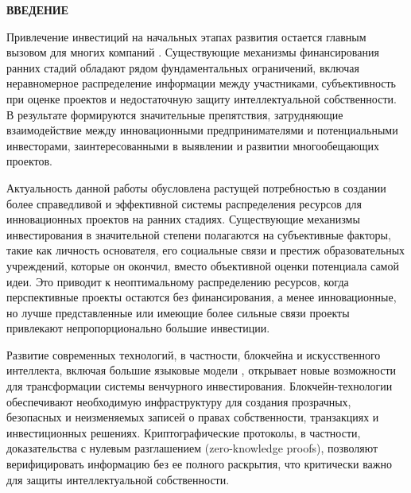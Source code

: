 \documentclass[
    candidate, %
    subf, %
    dotsinheaders=false,
]{disser}
\begin{document}
\sloppy



\renewcommand{\contentsname}{\centerline{СОДЕРЖАНИЕ}}
\setcounter{tocdepth}{1}
\tableofcontents

\newpage
\begin{center}
  \textbf{ВВЕДЕНИЕ}
\end{center}

Привлечение инвестиций на начальных этапах развития остается главным вызовом для многих компаний \cite{bernstein2017attracting}. Существующие механизмы финансирования ранних стадий обладают рядом фундаментальных ограничений, включая неравномерное распределение информации между участниками, субъективность при оценке проектов и недостаточную защиту интеллектуальной собственности. В результате формируются значительные препятствия, затрудняющие взаимодействие между инновационными предпринимателями и потенциальными инвесторами, заинтересованными в выявлении и развитии многообещающих проектов.


Актуальность данной работы обусловлена растущей потребностью в создании более справедливой и эффективной системы распределения ресурсов для инновационных проектов на ранних стадиях. Существующие механизмы инвестирования в значительной степени полагаются на субъективные факторы, такие как личность основателя, его социальные связи и престиж образовательных учреждений, которые он окончил, вместо объективной оценки потенциала самой идеи. Это приводит к неоптимальному распределению ресурсов, когда перспективные проекты остаются без финансирования, а менее инновационные, но лучше представленные или имеющие более сильные связи проекты привлекают непропорционально большие инвестиции.


Развитие современных технологий, в частности, блокчейна \cite{nakamoto2008bitcoin} и искусственного интеллекта, включая большие языковые модели \cite{vaswani2017attention},  открывает новые возможности для трансформации системы венчурного инвестирования. Блокчейн-технологии обеспечивают необходимую инфраструктуру для создания прозрачных, безопасных и неизменяемых записей о правах собственности, транзакциях и инвестиционных решениях. Криптографические протоколы, в частности, доказательства с нулевым разглашением (zero-knowledge proofs), позволяют верифицировать информацию без ее полного раскрытия, что критически важно для защиты интеллектуальной собственности.
\end{document}
